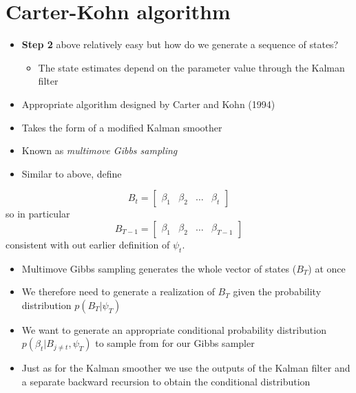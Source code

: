 \documentclass[
  letterpaper,
]{book}
\providecommand{\tightlist}{%
  \setlength{\itemsep}{0pt}\setlength{\parskip}{0pt}}\usepackage{longtable,booktabs,array}
\begin{document}
\hypertarget{carter-kohn-algorithm}{%
\section{Carter-Kohn algorithm}\label{carter-kohn-algorithm}}

\begin{itemize}
\item
  \textbf{Step 2} above relatively easy but how do we generate a
  sequence of states?

  \begin{itemize}
  \tightlist
  \item
    The state estimates depend on the parameter value through the Kalman
    filter
  \end{itemize}
\item
  Appropriate algorithm designed by Carter and Kohn (1994)
\item
  Takes the form of a modified Kalman smoother
\item
  Known as \emph{multimove Gibbs sampling}
\item
  Similar to above, define
\end{itemize}

\begin{equation}
  B_t = \begin{bmatrix} \beta_1 & \beta_2 & \ldots & \beta_t \end{bmatrix}
\end{equation} so in particular \begin{equation}
B_{T-1} = \begin{bmatrix} \beta_1 & \beta_2 & \ldots & \beta_{T-1} \end{bmatrix}
\end{equation} consistent with out earlier definition of \(\psi_t\).

\begin{itemize}
\tightlist
\item
  Multimove Gibbs sampling generates the whole vector of states
  (\(B_T\)) at once
\item
  We therefore need to generate a realization of \(B_T\) given the
  probability distribution \(p( B_T|\psi_T)\)
\item
  We want to generate an appropriate conditional probability
  distribution \(p(\beta_t|B_{j\neq t}, \psi_T)\) to sample from for our
  Gibbs sampler
\item
  Just as for the Kalman smoother we use the outputs of the Kalman
  filter and a separate backward recursion to obtain the conditional
  distribution
\end{itemize}
\end{document}
